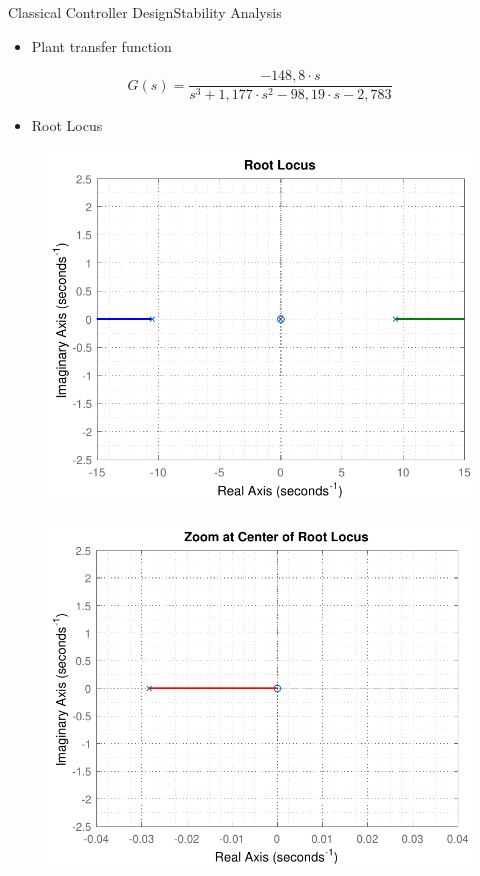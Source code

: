 \begin{frame}{Classical Controller Design}{Stability Analysis}	 
\begin{itemize}
	\item Plant transfer function
\end{itemize}
\begin{displaymath}
\si{G(s) = \frac{-148,8 \cdot s}{s^3 + 1,177 \cdot s^2 - 98,19 \cdot s - 2,783}}
\end{displaymath}
\pause	
\begin{itemize}
	\item Root Locus
\end{itemize}
\begin{minipage}{\linewidth}
	\begin{minipage}{0.45\linewidth}
		\begin{figure}
			\includegraphics[scale=.42]{Pictures/rlocusCubli}
			\centering
		\end{figure}
	\end{minipage}
	\hspace{0.1\linewidth}
	\begin{minipage}{0.45\linewidth}
		\begin{figure}[H]
			\includegraphics[scale=.35]{Pictures/rlocusCubliZoom}

\end{figure}
\end{minipage}
\end{minipage}
\end{frame}
